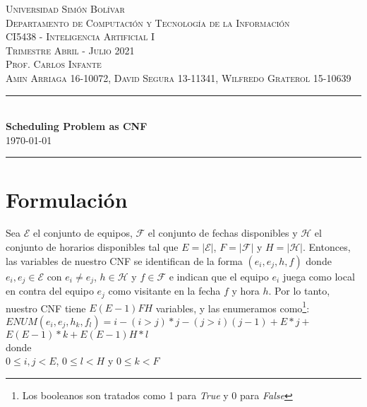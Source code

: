 \documentclass[a4paper,10pt]{article}
\date{}
\newcommand{\HRule}{\rule{\linewidth}{0.5mm}}
\begin{document}
\begin{center}
  \textsc {
    Universidad Simón Bolívar \\[0cm]
    Departamento de Computaci\'on y Tecnolog\'ia de la Informaci\'on \\[0cm]
    CI5438 - Inteligencia Artificial I \\[0cm]
    Trimestre Abril - Julio 2021 \\[0cm]
    Prof. Carlos Infante \\[0cm]
    Amin Arriaga 16-10072, David Segura 13-11341, Wilfredo Graterol 15-10639
  }
  \HRule \\[0.4cm]
  {\Large \textbf{Scheduling Problem as CNF}} \\[0.4cm]
  \textsc{
    \today
  }
  \HRule
\end{center}

\section{Formulaci\'on}
  Sea $\mathcal{E}$ el conjunto de equipos, $\mathcal{F}$ el conjunto de fechas 
  disponibles y $\mathcal{H}$ el conjunto de horarios disponibles tal que 
  $E = |\mathcal{E}|$, $F = |\mathcal{F}|$ y $H = |\mathcal{H}|$. Entonces, las 
  variables de nuestro CNF se identifican de la forma $(e_i,e_j,h,f)$ donde 
  $e_i,e_j \in \mathcal{E}$ con $e_i \neq e_j$, $h \in \mathcal{H}$ y 
  $f \in \mathcal{F}$ e indican que el equipo $e_i$ juega como local en contra 
  del equipo $e_j$ como visitante en la fecha $f$ y hora $h$. Por lo tanto, 
  nuestro CNF tiene $E(E-1)FH$ variables, y las enumeramos como\footnote{Los
  booleanos son tratados como 1 para \textit{True} y 0 para \textit{False}}: \\

  \noindent
  $ENUM(e_i, e_j, h_k, f_l) = i - (i > j)*j - (j > i)(j - 1) + E*j + $
  $E(E - 1)*k + E(E - 1)H*l$  \\ 

  \noindent
  donde \\

  \noindent
  $0 \leq i, j < E$, $0 \leq l < H$ y $0 \leq k < F$
  
\end{document}
